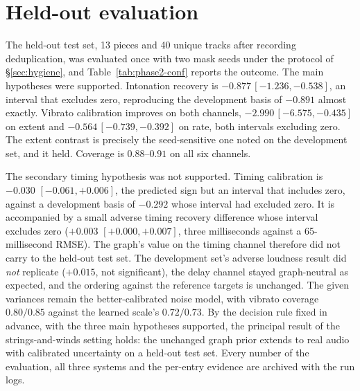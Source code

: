 \section{Held-out evaluation}
\label{sec:phase2-conf}
The held-out test set, 13 pieces and 40 unique tracks after recording
deduplication, was evaluated once with two mask seeds under the protocol
of \S\ref{sec:hygiene}, and Table~\ref{tab:phase2-conf} reports the
outcome. The main hypotheses were supported. Intonation recovery is
$-0.877\,[-1.236, -0.538]$, an interval that excludes zero, reproducing
the development basis of $-0.891$ almost exactly. Vibrato calibration
improves on both channels, $-2.990\,[-6.575, -0.435]$ on extent and
$-0.564\,[-0.739, -0.392]$ on rate, both intervals excluding zero. The
extent contrast is precisely the seed-sensitive one noted on the
development set, and it held. Coverage is $0.88$--$0.91$ on all six
channels.

The secondary timing hypothesis was not supported. Timing calibration is
$-0.030$ $[-0.061, +0.006]$, the predicted sign but an interval that
includes zero, against a development basis of $-0.292$ whose interval had
excluded zero. It is accompanied by a small adverse timing recovery
difference whose interval excludes zero ($+0.003$ $[+0.000, +0.007]$,
three milliseconds against a 65-millisecond RMSE). The graph's value on
the timing channel therefore did not carry to the held-out test set. The development set's adverse loudness result did
\emph{not} replicate ($+0.015$, not significant), the delay channel
stayed graph-neutral as expected, and the ordering against the reference
targets is unchanged. The given variances remain the better-calibrated
noise model, with vibrato coverage $0.80/0.85$ against the learned
scale's $0.72/0.73$. By the decision rule fixed in advance, with the
three main hypotheses supported, the principal result of the
strings-and-winds setting holds: the unchanged graph prior extends to
real audio with calibrated uncertainty on a held-out test set. Every
number of the evaluation, all three systems and the per-entry evidence
are archived with the run logs.

